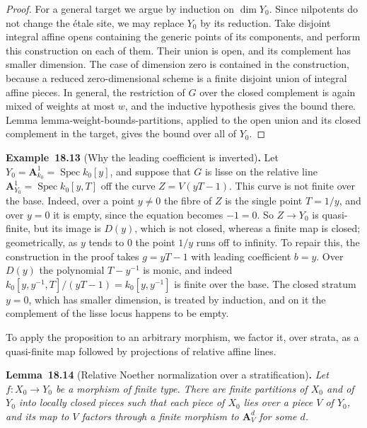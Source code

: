 \documentclass[11pt]{article}
\newenvironment{bpstatement}[2]{\par\addvspace{0.6\baselineskip}\noindent\textbf{#1}#2\textbf{.}\enspace\ignorespaces}
  {\par\addvspace{0.4\baselineskip}}
\newenvironment{bpstatementit}[2]{\begin{bpstatement}{#1}{#2}\itshape\ignorespaces}{\end{bpstatement}}
\begin{document}
\begin{proof}[{Proof}]
For a general target we argue by induction on \(\dim Y_0\). Since nilpotents do not change the étale site, we may replace \(Y_0\) by its reduction. Take disjoint integral affine opens containing the generic points of its components, and perform this construction on each of them. Their union is open, and its complement has smaller dimension. The case of dimension zero is contained in the construction, because a reduced zero-dimensional scheme is a finite disjoint union of integral affine pieces. In general, the restriction of \(G\) over the closed complement is again mixed of weights at most \(w\), and the inductive hypothesis gives the bound there. Lemma lemma-weight-bounds-partitions, applied to the open union and its closed complement in the target, gives the bound over all of \(Y_0\).
\end{proof}

\label{bp310}%
\begin{bpstatement}{Example~18.13}{ (Why the leading coefficient is inverted)}
Let \(Y_0=\mathbf A^1_{k_0}=\operatorname{Spec}k_0[y]\), and suppose that \(G\) is lisse on the relative line \(\mathbf A^1_{Y_0}=\operatorname{Spec}k_0[y,T]\) off the curve \(Z=V(yT-1)\). This curve is not finite over the base. Indeed, over a point \(y\ne0\) the fibre of \(Z\) is the single point \(T=1/y\), and over \(y=0\) it is empty, since the equation becomes \(-1=0\). So \(Z\to Y_0\) is quasi-finite, but its image is \(D(y)\), which is not closed, whereas a finite map is closed; geometrically, as \(y\) tends to \(0\) the point \(1/y\) runs off to infinity. To repair this, the construction in the proof takes \(g=yT-1\) with leading coefficient \(b=y\). Over \(D(y)\) the polynomial \(T-y^{-1}\) is monic, and indeed \(k_0[y,y^{-1},T]/(yT-1)=k_0[y,y^{-1}]\) is finite over the base. The closed stratum \(y=0\), which has smaller dimension, is treated by induction, and on it the complement of the lisse locus happens to be empty.
\end{bpstatement}

\label{bp311}%
To apply the proposition to an arbitrary morphism, we factor it, over strata, as a quasi-finite map followed by projections of relative affine lines.

\label{bp312}%
\begin{bpstatementit}{Lemma~18.14}{ (Relative Noether normalization over a stratification)}
Let \(f:X_0\to Y_0\) be a morphism of finite type. There are finite partitions of \(X_0\) and of \(Y_0\) into locally closed pieces such that each piece of \(X_0\) lies over a piece \(V\) of \(Y_0\), and its map to \(V\) factors through a finite morphism to \(\mathbf A^d_V\) for some \(d\).
\end{bpstatementit}
\end{document}
